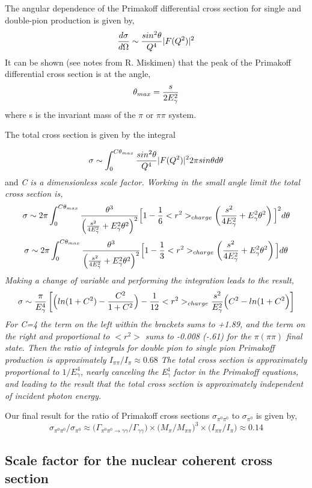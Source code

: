 The angular dependence of the Primakoff differential cross section for single and double-pion production is given by,
$$ {d\sigma \over d \Omega} \sim {sin^2 \theta \over Q^4}|F(Q^2)|^2$$
It can be shown (see notes from R. Miskimen) that the peak of the Primakoff differential cross section is at the angle,
$$ \theta_{max}={s \over 2 E^2_\gamma}$$
where s is the invariant mass of the $\pi$ or $\pi \pi$ system.  

The total cross section is given by the integral

$$ \sigma \sim \int^{C\theta_{max}}_0 {sin^2 \theta \over Q^4}|F(Q^2)|^2 2 \pi sin \theta d\theta$$
and \it C \rm is a dimensionless scale factor. Working in the small angle limit the total cross section is,
$$\sigma \sim 2\pi \int^{C\theta_{max}}_0 
{\theta^3 \over \left( {s^2 \over 4E^2_\gamma}+ E^2_\gamma \theta^2  \right)^2} 
\Big[ 1-{1 \over 6}<r^2>_{charge}\left( {s^2 \over 4E^2_\gamma}+ E^2_\gamma \theta^2  \right)\Big]^2
d \theta$$
$$\sigma \sim 2\pi \int^{C\theta_{max}}_0 
{\theta^3 \over \left( {s^2 \over 4E^2_\gamma}+ E^2_\gamma \theta^2  \right)^2} 
\Big[ 1-{1 \over 3}<r^2>_{charge}\left( {s^2 \over 4E^2_\gamma}+ E^2_\gamma \theta^2  \right)\Big]
d \theta$$
Making a change of variable and performing the integration leads to the result, 
$$ \sigma \sim {\pi \over E^4_\gamma}
\left[ \Big( ln(1+C^2)-{C^2 \over 1+C^2}  \Big)
- {1 \over 12}<r^2>_{charge}{s^2 \over E^2_\gamma}
\Big(C^2-ln(1+C^2 \Big) \right]$$
For C=4 the term on the left within the brackets sums to +1.89, and the term on the right and proportional to $<r^2>$ sums to -0.008 (-.61) for the $\pi (\pi \pi)$ final state.  Then the ratio of integrals for double pion to single pion Primakoff production is approximately $I_{\pi\pi} / I_{\pi} \approx 0.68$
The total cross section is approximately proportional to $1/E^4_\gamma$, nearly canceling the E$^4_\gamma$ factor in the Primakoff equations, and leading to the result that the total cross section is approximately independent of incident photon energy.   


Our final result for the ratio of Primakoff cross sections $\sigma_{\pi^0 \pi^0}$ to $ \sigma_{\pi^0}$ is given by, 
$$  \sigma_{\pi^0 \pi^0}   \Big/ \sigma_{ \pi^0}   
\approx 
\Big(\Gamma_{\pi^0 \pi^0 \rightarrow \gamma \gamma}
\Big/ \Gamma_{\gamma \gamma} \Big)
\times \Big( M_\pi \Big/ 
M_{\pi \pi}\Big)^3\times \Big( I_{\pi \pi} \Big/ I_\pi \Big)
\approx 0.14$$



 \subsection{Scale factor for the nuclear coherent cross section}

